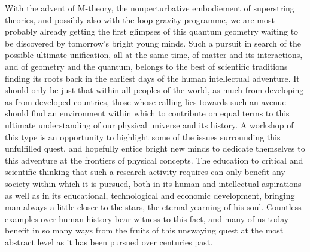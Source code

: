 \documentclass[a4paper,11pt]{article}
\begin{document}
With the advent of M-theory,\cite{Pol} the nonperturbative embodiement of
superstring theories,\cite{GSW} and possibly also with the loop gravity 
programme,\cite{Loop}
we are most probably already getting the first glimpses of this
quantum geometry wai\-ting to be discovered by tomorrow's bright
young minds. Such a pursuit in search of the possible ultimate
unification, all at the same time, of matter and its interactions, and of 
geometry and the quantum, belongs to the best of scientific traditions finding 
its roots back in the earliest days of the human intellectual adventure. 
It should only be just that within all peoples of the world, as much
from developing as from developed countries, those whose
calling lies towards such an avenue should find an environment
within which to contribute on equal terms to this ultimate understanding
of our physical universe and its history. A workshop of this type
is an opportunity to highlight some of the issues surrounding this
unfulfilled quest, and hopefully entice bright new minds to dedicate
themselves to this adventure at the frontiers of physical concepts. 
The education to critical and scientific thinking that such a research 
activity requires can only benefit any society within which it is pursued, 
both in its human and intellectual aspirations as well as in its 
edu\-ca\-tio\-nal,
technological and economic development, bringing man always a little closer 
to the stars, the eternal yearning of his soul. Countless examples over human
history bear witness to this fact, and many of us today benefit in so many
ways from the fruits of this unswaying quest at the most abstract level as it 
has been pursued over centuries past.
\end{document}
